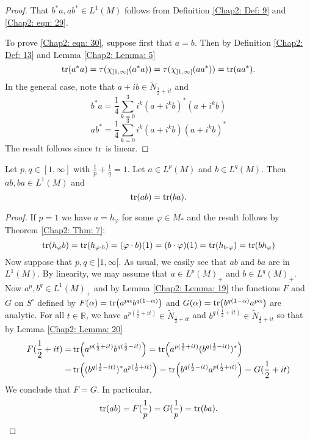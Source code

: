 \begin{proof}
    That $b^*a, ab^*\in L^1(M)$ follows from Definition \ref{Chap2: Def: 9} and \eqref{Chap2: eqn: 29}.\par
To prove \eqref{Chap2: eqn: 30}, suppose first that $a=b$. Then by Definition \ref{Chap2: Def: 13} and Lemma \ref{Chap2: Lemma: 5}
\[
    \tr(a^*a)=\tau(\chi_{]1,\infty[}(a^*a))=\tau(\chi_{]1,\infty[}(aa^*))=\tr(aa^*).
\]
In the general case, note that $a+ib\in \tilde{N}_{\frac{1}{2}+it}$ and 
\[
    b^*a=\frac{1}{4}\sum_{k=0}^3 i^k(a+i^kb)^*(a+i^kb)
\]
\[
    ab^*=\frac{1}{4}\sum_{k=0}^3 i^k(a+i^kb)(a+i^kb)^*
\]
The result follows since $\tr$ is linear.
\end{proof}
\begin{proposition}
Let $p,q\in [1,\infty]$ with $\frac{1}{p}+\frac{1}{q}=1$. Let $a\in L^p(M)$ and $b\in L^q(M)$. Then $ab,ba\in L^1(M)$ and 
\[
    \tr(ab) = \tr(ba).
\]
\end{proposition}
\begin{proof}
    If $p=1$ we have $a=h_\varphi$ for some $\varphi\in M_*$ and the result follows by Theorem \ref{Chap2: Thm: 7}:
    \[
        \tr(h_\varphi b)=\tr(h_{\varphi\cdot b})=(\varphi\cdot b)(1)=(b\cdot \varphi)(1)=\tr(h_{b\cdot\varphi})=\tr(bh_\varphi)
    \] 
    Now suppose that $p,q\in ]1,\infty[$. As usual, we easily see that $ab$ and $ba$ are in $L^1(M)$. By linearity, we may assume that $a\in L^p(M)_+$ and $b\in L^q(M)_+$. Now $a^p,b^q\in L^1(M)_+$ and by Lemma \ref{Chap2: Lemma: 19} the functions $F$ and $G$ on $S^\circ$ defined by $F(\alpha)=\tr(a^{p\alpha}b^{q(1-\alpha)})$ and $G(\alpha)=\tr(b^{q(1-\alpha)}a^{p\alpha})$ are analytic. For all $t\in \mathbb{R}$, we have $a^{p(\frac{1}{2}+it)}\in\tilde{N}_{\frac{1}{2}+it}$ and $b^{q(\frac{1}{2}+it)}\in \tilde{N}_{\frac{1}{2}+it}$ so that by Lemma \ref{Chap2: Lemma: 20}
    \[
        \begin{split}
            F(\frac{1}{2}+it)=&\tr(a^{p(\frac{1}{2}+it)}b^{q(\frac{1}{2}-it)})=\tr(a^{p(\frac{1}{2}+it)}(b^{q(\frac{1}{2}-it)})^*)\\
            =&\tr((b^{q(\frac{1}{2}-it)})^*a^{p(\frac{1}{2}+it)})=\tr(b^{q(\frac{1}{2}-it)}a^{p(\frac{1}{2}+it)})=G(\frac{1}{2}+it)
        \end{split}
    \] 
We conclude that $F=G$. In particular,
\[
    \tr(ab)=F(\frac{1}{p})=G(\frac{1}{p})=\tr(ba).
\]
\end{proof}
% 